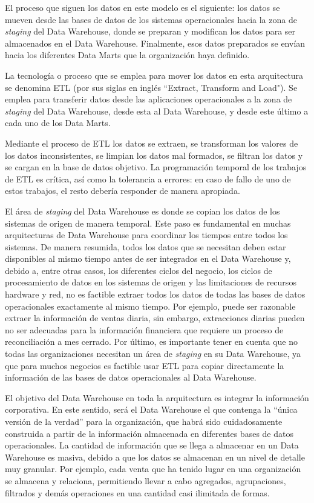 \documentclass[a4paper, 12pt]{book}
\begin{document}
El proceso que siguen los datos en este modelo es el siguiente: los datos se mueven desde las bases de datos de los sistemas operacionales hacia la zona de \textit{staging} del Data Warehouse, donde se preparan y modifican los datos para ser almacenados en el Data Warehouse. Finalmente, esos datos preparados se envían hacia los diferentes Data Marts que la organización haya definido.

La tecnología o proceso que se emplea para mover los datos en esta arquitectura se denomina ETL (por sus siglas en inglés ``Extract, Transform and Load"). Se emplea para transferir datos desde las aplicaciones operacionales a la zona de \textit{staging} del Data Warehouse, desde esta al Data Warehouse, y desde este último a cada uno de los Data Marts.

Mediante el proceso de ETL los datos se extraen, se transforman los valores de los datos inconsistentes, se limpian los datos mal formados, se filtran los datos y se cargan en la base de datos objetivo. La programación temporal de los trabajos de ETL es crítica, así como la tolerancia a errores: en caso de fallo de uno de estos trabajos, el resto debería responder de manera apropiada.

El área de \textit{staging} del Data Warehouse es donde se copian los datos de los sistemas de origen de manera temporal. Este paso es fundamental en muchas arquitecturas de Data Warehouse para coordinar los tiempos entre todos los sistemas. De manera resumida, todos los datos que se necesitan deben estar disponibles al mismo tiempo antes de ser integrados en el Data Warehouse y, debido a, entre otras casos, los diferentes ciclos del negocio, los ciclos de procesamiento de datos en los sistemas de origen y las limitaciones de recursos hardware y red, no es factible extraer todos los datos de todas las bases de datos operacionales exactamente al mismo tiempo. Por ejemplo, puede ser razonable extraer la información de ventas diaria, sin embargo, extracciones diarias pueden no ser adecuadas para la información financiera que requiere un proceso de reconciliación a mes cerrado. Por último, es importante tener en cuenta que no todas las organizaciones necesitan un área de \textit{staging} en su Data Warehouse, ya que para muchos negocios es factible usar ETL para copiar directamente la información de las bases de datos operacionales al Data Warehouse.

El objetivo del Data Warehouse en toda la arquitectura es integrar la información corporativa. En este sentido, será el Data Warehouse el que contenga la “única versión de la verdad” para la organización, que habrá sido cuidadosamente construida a partir de la información almacenada en diferentes bases de datos operacionales. La cantidad de información que se llega a almacenar en un Data Warehouse es masiva, debido a que los datos se almacenan en un nivel de detalle muy granular. Por ejemplo, cada venta que ha tenido lugar en una organización se almacena y relaciona, permitiendo llevar a cabo agregados, agrupaciones, filtrados y demás operaciones en una cantidad casi ilimitada de formas.
\end{document}
